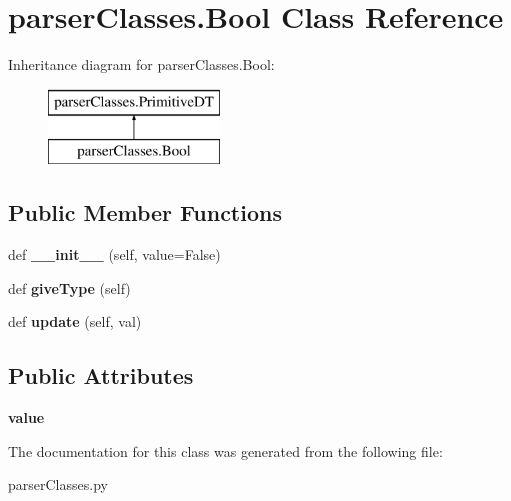 \hypertarget{classparser_classes_1_1_bool}{}\section{parser\+Classes.\+Bool Class Reference}
\label{classparser_classes_1_1_bool}
Inheritance diagram for parser\+Classes.\+Bool\+:\begin{figure}[H]
\begin{center}
\leavevmode
\includegraphics[height=2.000000cm]{classparser_classes_1_1_bool}
\end{center}
\end{figure}
\subsection*{Public Member Functions}
\begin{DoxyCompactItemize}
\item 
def {\bfseries \+\_\+\+\_\+init\+\_\+\+\_\+} (self, value=False)\hypertarget{classparser_classes_1_1_bool_aea596343fcf5032e9d9900cbe01402a5}{}\label{classparser_classes_1_1_bool_aea596343fcf5032e9d9900cbe01402a5}

\item 
def {\bfseries give\+Type} (self)\hypertarget{classparser_classes_1_1_bool_a75f6909f270b96cceb0ff893d28e83c1}{}\label{classparser_classes_1_1_bool_a75f6909f270b96cceb0ff893d28e83c1}

\item 
def {\bfseries update} (self, val)\hypertarget{classparser_classes_1_1_bool_a0d8251d04d4402acc11de38fe599fb12}{}\label{classparser_classes_1_1_bool_a0d8251d04d4402acc11de38fe599fb12}

\end{DoxyCompactItemize}
\subsection*{Public Attributes}
\begin{DoxyCompactItemize}
\item 
{\bfseries value}\hypertarget{classparser_classes_1_1_bool_ab05879f8663a2e6ecb4a2dec445cbed0}{}\label{classparser_classes_1_1_bool_ab05879f8663a2e6ecb4a2dec445cbed0}

\end{DoxyCompactItemize}


The documentation for this class was generated from the following file\+:\begin{DoxyCompactItemize}
\item 
parser\+Classes.\+py\end{DoxyCompactItemize}
